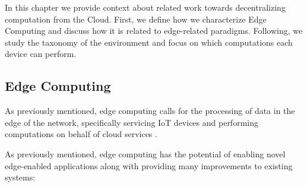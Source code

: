 

In this chapter we provide context about related work towards decentralizing computation from the Cloud. First, we define how we characterize Edge Computing and discuss how it is related to edge-related paradigms. Following, we study the taxonomy of the environment and focus on which computations each device can perform.

\subsection{Edge Computing}

As previously mentioned, edge computing calls for the processing of data in the edge of the network, specifically servicing IoT devices and performing computations on behalf of cloud services \cite{7488250}.

As previously mentioned, edge computing has the potential of enabling novel edge-enabled applications along with providing many improvements to existing systems:

